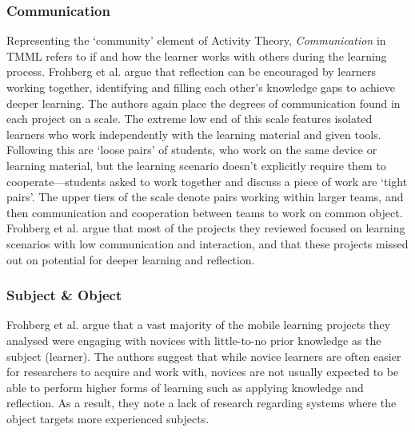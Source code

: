 \subsubsection{Communication}
Representing the `community' element of Activity Theory, \textit{Communication} in TMML refers to if and how the learner works with others during the learning process. Frohberg et al. argue that reflection can be encouraged by learners working together, identifying and filling each other's knowledge gaps to achieve deeper learning. The authors again place the degrees of communication found in each project on a scale. The extreme low end of this scale features isolated learners who work independently with the learning material and given tools. Following this are `loose pairs' of students, who work on the same device or learning material, but the learning scenario doesn't explicitly require them to cooperate---students asked to work together and discuss a piece of work are `tight pairs'. The upper tiers of the scale denote pairs working within larger teams, and then communication and cooperation between teams to work on common object. Frohberg et al. argue that most of the projects they reviewed focused on learning scenarios with low communication and interaction, and that these projects missed out on potential for deeper learning and reflection.

\subsubsection{Subject \& Object}
Frohberg et al. argue that a vast majority of the mobile learning projects they analysed were engaging with novices with little-to-no prior knowledge as the subject (learner). The authors suggest that while novice learners are often easier for researchers to acquire and work with, novices are not usually expected to be able to perform higher forms of learning such as applying knowledge and reflection. As a result, they note a lack of research regarding systems where the object targets more experienced subjects.



